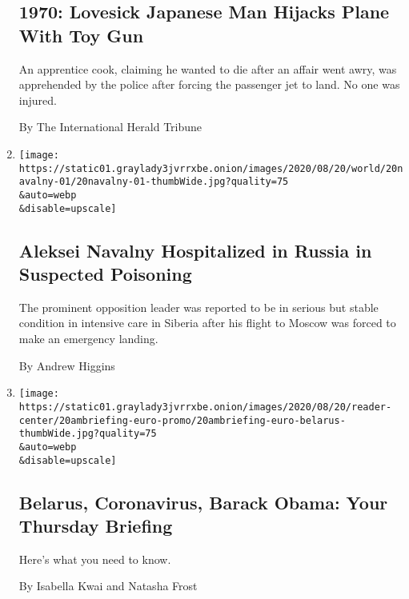 \begin{enumerate}
  \hypertarget{1970-lovesick-japanese-man-hijacks-plane-with-toy-gun}{%
  \subsection{1970: Lovesick Japanese Man Hijacks Plane With Toy
  Gun}\label{1970-lovesick-japanese-man-hijacks-plane-with-toy-gun}}

  An apprentice cook, claiming he wanted to die after an affair went
  awry, was apprehended by the police after forcing the passenger jet to
  land. No one was injured.

  By The International Herald Tribune
\item
  \href{/2020/08/20/world/europe/navalny-poison-russia.html}{}

  \texttt{[image: https://static01.graylady3jvrrxbe.onion/images/2020/08/20/world/20navalny-01/20navalny-01-thumbWide.jpg?quality=75\\\&auto=webp\\\&disable=upscale]}

  \hypertarget{aleksei-navalny-hospitalized-in-russia-in-suspected-poisoning}{%
  \subsection{Aleksei Navalny Hospitalized in Russia in Suspected
  Poisoning}\label{aleksei-navalny-hospitalized-in-russia-in-suspected-poisoning}}

  The prominent opposition leader was reported to be in serious but
  stable condition in intensive care in Siberia after his flight to
  Moscow was forced to make an emergency landing.

  By Andrew Higgins
\item
  \href{/2020/08/20/briefing/belarus-coronavirus-barack-obama.html}{}

  \texttt{[image: https://static01.graylady3jvrrxbe.onion/images/2020/08/20/reader-center/20ambriefing-euro-promo/20ambriefing-euro-belarus-thumbWide.jpg?quality=75\\\&auto=webp\\\&disable=upscale]}

  \hypertarget{belarus-coronavirus-barack-obama-your-thursday-briefing}{%
  \subsection{Belarus, Coronavirus, Barack Obama: Your Thursday
  Briefing}\label{belarus-coronavirus-barack-obama-your-thursday-briefing}}

  Here's what you need to know.

  By Isabella Kwai and Natasha Frost
\end{enumerate}

